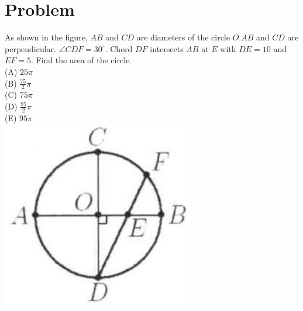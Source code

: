 \documentclass{article}
\begin{document}
\section*{Problem}
As shown in the figure, \(A B\) and \(C D\) are diameters of the circle \(O . A B\) and \(C D\) are perpendicular. \(\angle C D F=30^{\circ}\). Chord \(D F\) intersects \(A B\) at \(E\) with \(D E=10\) and \(E F=5\). Find the area of the circle.\\
(A) \(25 \pi\)\\
(B) \(\frac{75}{2} \pi\)\\
(C) \(75 \pi\)\\
(D) \(\frac{95}{2} \pi\)\\
(E) \(95 \pi\)\\
\centering
\includegraphics[width=\textwidth]{images/170(1).jpg}
\end{document}
